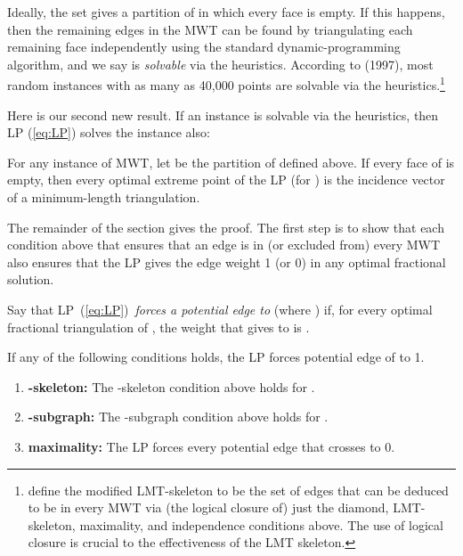 \documentclass[final]{siamltex}
\newcommand{\refLP}{(\ref{eq:LP})\xspace}
\begin{document}
Ideally, the set  gives a partition of  in which every face is empty.
If this happens, then the remaining edges in the MWT can be found
by triangulating each remaining face independently using the standard
dynamic-programming algorithm, and we say  is {\em solvable} via the heuristics.
According to \cite{dickerson1997large} (1997),
most random instances with as many as 40,000 points are solvable via the heuristics.\footnote
{\cite{dickerson1997large} define the modified LMT-skeleton to be
the set of edges that can be deduced to be in every MWT via 
(the logical closure of) just the 
diamond, LMT-skeleton, maximality, and independence conditions above.
The use of logical closure is crucial to the effectiveness of the LMT skeleton.
}  

Here is our second new result.  If an instance is solvable via the heuristics,
then LP \refLP solves the instance also:
\begin{theorem}\label{thm:heuristics}
  For any instance  of MWT,
  let  be the partition of  defined above.
  If every face of  is empty, then every optimal extreme point of the LP (for )
  is the incidence vector of a minimum-length triangulation.
\end{theorem}

The remainder of the section gives the proof. The first step is to show that each condition above that ensures that an edge is in
(or excluded from) every MWT also ensures that the LP gives the edge weight 1 (or 0)
in any optimal fractional solution.

Say that LP~\refLP\ {\em forces a potential edge  to } (where )
if, for every optimal fractional triangulation  of ,
the weight that  gives to  is .

\begin{lemma}\label{lemma:in}
  If any of the following conditions holds, the LP forces potential edge  of  to 1.
  \begin{enumerate}
  \item \label{in:beta}
    {\bf -skeleton:} The -skeleton condition above holds for .
\item \label{in:YXY}
    {\bf -subgraph:} The -subgraph condition above holds for .
\item \label{in:maximality}
    {\bf maximality:}
    The LP forces every potential edge that crosses  to 0.
  \end{enumerate}
\end{lemma}
\end{document}
